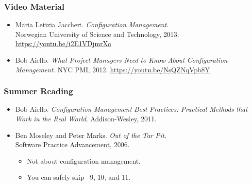 \begin{frame}

\frametitle{Video Material}

\footnotesize

\begin{itemize}

\item Maria Letizia Jaccheri. \emph{Configuration Management}. \\ Norwegian
University of Science and Technology, 2013. \url{https://youtu.be/i2E1VDjmrXo}

\item Bob Aiello. \emph{What Project Managers Need to Know About Configuration
Management}. NYC PMI, 2012. \url{https://youtu.be/NsQZNqVpb8Y}

\end{itemize}

\end{frame}


\begin{frame}

\frametitle{Summer Reading}

\footnotesize

\begin{itemize}

\item Bob Aiello. \emph{Configuration Management Best Practices: Practical
Methods that Work in the Real World}. Addison-Wesley, 2011.

\end{itemize}

\vspace{\fill}

\begin{itemize}

\item Ben Moseley and Peter Marks. \emph{Out of the Tar Pit}. \\ Software
Practice Advancement, 2006.

\begin{itemize}

\footnotesize

\item Not about configuration management.

\item You can safely skip \textsection\textsection~9, 10, and 11.

\end{itemize}

\end{itemize}

\end{frame}
